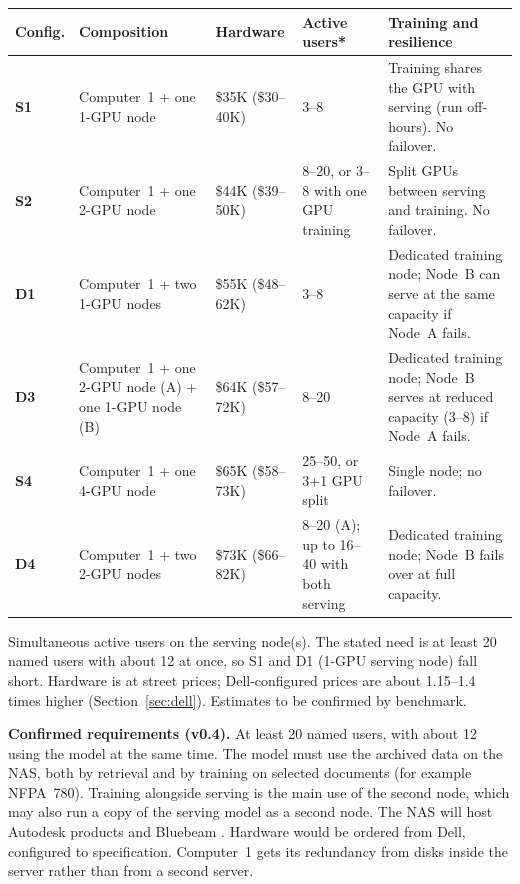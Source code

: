 {\footnotesize
\begin{xltabular}{\textwidth}{@{}l Y{1.062} l Y{0.692} Y{1.246}@{}}
  \toprule
  Config. & Composition & Hardware & Active users* & Training and resilience \\
  \midrule
  \endhead
  \textbf{S1} & Computer~1 + one 1-GPU node & \$35K (\$30--40K) & 3--8 & Training shares the GPU with serving (run off-hours). No failover. \\
  \textbf{S2} & Computer~1 + one 2-GPU node & \$44K (\$39--50K) & 8--20, or 3--8 with one GPU training & Split GPUs between serving and training. No failover. \\
  \textbf{D1} & Computer~1 + two 1-GPU nodes & \$55K (\$48--62K) & 3--8 & Dedicated training node; Node~B can serve at the same capacity if Node~A fails. \\
  \textbf{D3} & Computer~1 + one 2-GPU node (A) + one 1-GPU node (B) & \$64K (\$57--72K) & 8--20 & Dedicated training node; Node~B serves at reduced capacity (3--8) if Node~A fails. \\
  \textbf{S4} & Computer~1 + one 4-GPU node & \$65K (\$58--73K) & 25--50, or 3+1 GPU split & Single node; no failover. \\
  \textbf{D4} & Computer~1 + two 2-GPU nodes & \$73K (\$66--82K) & 8--20 (A); up to 16--40 with both serving & Dedicated training node; Node~B fails over at full capacity. \\
  \bottomrule
\end{xltabular}}
{\footnotesize * Simultaneous active users on the serving node(s). The stated need is at least 20 named users with about 12 at once, so S1 and D1 (1-GPU serving node) fall short. Hardware is at street prices; Dell-configured prices are about 1.15--1.4 times higher (Section~\ref{sec:dell}). Estimates to be confirmed by benchmark.}

\textbf{Confirmed requirements (v0.4).} At least 20 named users, with about 12 using
the model at the same time. The model must use the archived data on the NAS, both by
retrieval and by training on selected documents (for example NFPA~780). Training
alongside serving is the main use of the second node, which may also run a copy of
the serving model as a second node. The NAS will host Autodesk products and Bluebeam
. Hardware would be ordered from Dell, configured to
specification. Computer~1 gets its redundancy from disks inside the server rather
than from a second server.

